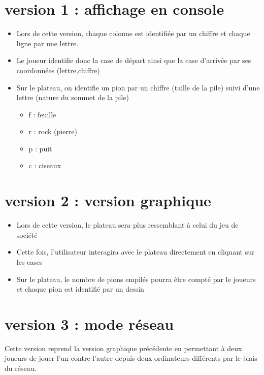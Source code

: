 \documentclass[12pt]{article}
\begin{document}
\section{version 1 : affichage en console}
\begin{itemize}
 \item Lors de cette version, chaque colonne est identifiée par un chiffre et chaque ligne par une lettre.
 \item Le joueur identifie donc la case de départ ainsi que la case d'arrivée par ses coordonnées (lettre,chiffre)
 \item Sur le plateau, on identifie un pion par un chiffre (taille de la pile) suivi d'une lettre (nature du sommet de la pile)
 \begin{itemize}
  \item[\textbullet] f : feuille
  \item[\textbullet] r : rock (pierre)
  \item[\textbullet] p : puit
  \item[\textbullet] c : ciseaux
 \end{itemize}
\end{itemize}
\section{version 2 : version graphique}
\begin{itemize}
 \item Lors de cette version, le plateau sera plus ressemblant à celui du jeu de société
 \item Cette fois, l'utilisateur interagira avec le plateau directement en cliquant sur les cases
 \item Sur le plateau, le nombre de pions empilés pourra être compté par le joueurs et chaque pion est identifié par un dessin
\end{itemize}

\section{version 3 : mode réseau}

Cette version reprend la version graphique précédente en permettant à deux joueurs de jouer l'un contre l'autre depuis deux ordinateurs différents par le biais du réseau.
 
\end{document}
